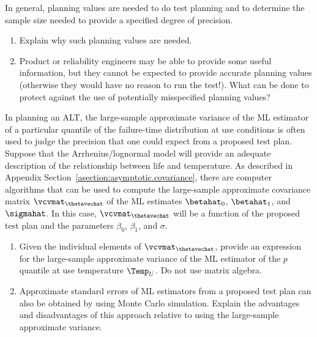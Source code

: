 \begin{exercise}
In general, planning values are needed to do test planning and to
determine the sample size needed to provide a specified degree of
precision.
\begin{enumerate}
\item
Explain why such planning values are needed.
\item
Product or reliability engineers may be able to provide some useful
information, but they cannot be expected to provide accurate planning
values (otherwise they would have no reason to run the test!). What
can be done to protect against the use of potentially misspecified
planning values?
\end{enumerate}
\end{exercise}

\begin{exercise}
In planning an ALT, the large-sample approximate variance of the ML
estimator of a particular quantile of the failure-time distribution
at use conditions is often used to judge the precision that one
could expect from a proposed test plan. Suppose that the
Arrhenius/lognormal model will provide an adequate description of
the relationship between life and temperature. As described in
Appendix Section~\ref{asection:asymptotic.covariance}, there are
computer algorithms that can be used to compute the large-sample approximate 
covariance matrix $\vcvmat_{\thetavechat}$ of the ML estimates
$\betahat_{0}$, $\betahat_{1}$, and $\sigmahat$. In this case,
$\vcvmat_{\thetavechat}$ will be a function of the proposed test
plan and the parameters $\beta_{0}$, $\beta_{1}$, and $\sigma$.
\begin{enumerate}
\item
Given the individual elements of $\vcvmat_{\thetavechat}$, provide
an expression for the large-sample approximate variance
of the ML estimator of the $p$ quantile at use temperature
$\Temp_{U}$. Do not use matrix algebra.
\item
Approximate standard errors of ML estimators from a proposed test
plan can also be obtained by using Monte Carlo simulation. Explain
the advantages and disadvantages of this approach relative to using
the large-sample approximate variance.
\end{enumerate}
\end{exercise}

